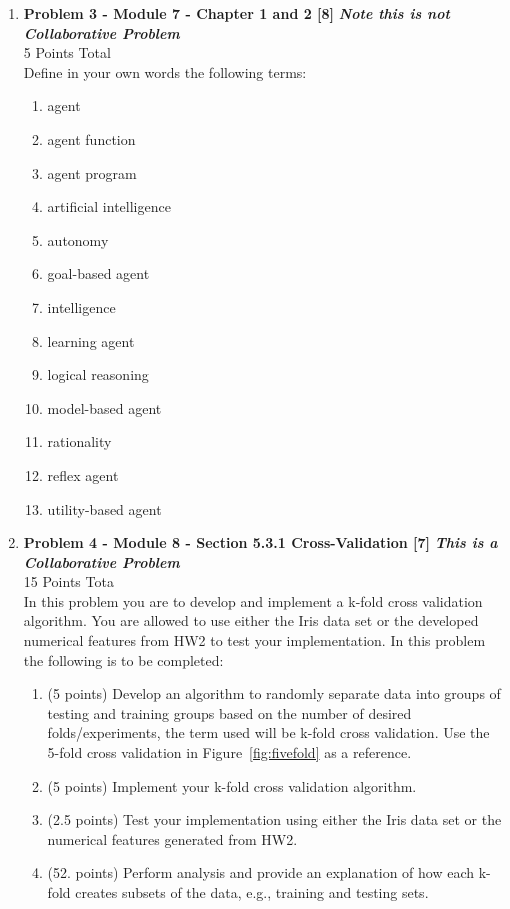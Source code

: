 \documentclass{article}
\begin{document}
\begin{enumerate}
    \vspace{5mm}

	\pagebreak

    \item \textbf{Problem 3 - Module 7 - Chapter 1 and 2 [8]} \textbf{\emph{Note this is not Collaborative Problem}}\\
    5 Points Total\\
    
    Define in your own words the following terms: 
    \begin{enumerate}
		\item agent
		\item agent function
		\item agent program
		\item artificial intelligence
		\item autonomy
		\item goal-based agent
		\item intelligence
		\item learning agent
		\item logical reasoning
		\item model-based agent
		\item rationality 
		\item reflex agent
		\item utility-based agent
	\end{enumerate}
    
    \pagebreak


    \item \textbf{Problem 4 - Module 8 - Section 5.3.1 Cross-Validation [7]} \textbf{\emph{This is a Collaborative Problem}}\\
    15 Points Tota\\

	In this problem you are to develop and implement a k-fold cross validation algorithm. You are allowed to use either the Iris data set or the developed numerical features from HW2 to test your implementation. In this problem the following is to be completed:\\
	
	\begin{enumerate}
		\item (5 points) Develop an algorithm to randomly separate data into groups of testing and training groups based on the number of desired folds/experiments, the term used will be k-fold cross validation. Use the 5-fold cross validation in Figure~\ref{fig:fivefold} as a reference. 
		\item (5 points) Implement your k-fold cross validation algorithm.  
		\item (2.5 points) Test your implementation using either the Iris data set or the numerical features generated from HW2.
		\item (52. points) Perform analysis and provide an explanation of how each k-fold creates subsets of the data, e.g., training and testing sets.
	

\end{enumerate}
\end{enumerate}
\end{document}
